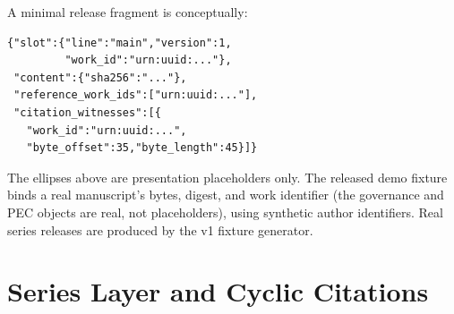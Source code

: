 \documentclass[acmsmall,screen,review,nonacm]{acmart}
\begin{document}
A minimal release fragment is conceptually:
\begin{verbatim}
{"slot":{"line":"main","version":1,
         "work_id":"urn:uuid:..."},
 "content":{"sha256":"..."},
 "reference_work_ids":["urn:uuid:..."],
 "citation_witnesses":[{
   "work_id":"urn:uuid:...",
   "byte_offset":35,"byte_length":45}]}
\end{verbatim}
The ellipses above are presentation placeholders only. The released demo
fixture binds a real manuscript's bytes, digest, and work identifier (the
governance and PEC objects are real, not placeholders), using synthetic author
identifiers. Real series releases are produced by the v1 fixture generator.

\section{Series Layer and Cyclic Citations}
\end{document}
